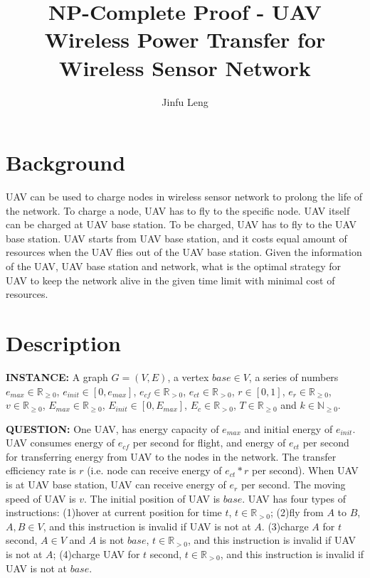 \usepackage{amsfonts}


\title{NP-Complete Proof - UAV Wireless Power Transfer for Wireless Sensor Network}
\author{Jinfu Leng}
\maketitle
\section{Background}
UAV can be used to charge nodes in wireless sensor network to prolong the life of the network. To charge a node, UAV has to fly to the specific node. UAV itself can be charged at UAV base station. To be charged, UAV has to fly to the UAV base station. UAV starts from UAV base station, and it costs equal amount of resources when the UAV flies out of the UAV base station. Given the information of the UAV, UAV base station and network, what is the optimal strategy for UAV to keep the network alive in the given time limit with minimal cost of resources.

\section{Description}
\noindent
\textbf{INSTANCE:} 
A graph $G = (V, E)$, a vertex $base \in V$, a series of numbers $e_{max} \in \mathbb{R}_{\geq0}$, $e_{init} \in [0, e_{max}]$, $e_{cf} \in \mathbb{R}_{>0}$, $e_{ct} \in \mathbb{R}_{>0}$, $r \in [0, 1]$, $e_r \in \mathbb{R}_{\geq0}$, $v \in \mathbb{R}_{\geq0}$, $E_{max} \in \mathbb{R}_{\geq0}$, $E_{init} \in [0, E_{max}]$, $E_{c} \in \mathbb{R}_{>0}$, $T \in \mathbb{R}_{\geq0}$ and $k \in \mathbb{N}_{\geq0}$.

\noindent
\textbf{QUESTION:} 
One UAV, has energy capacity of $e_{max}$ and initial energy of $e_{init}$. UAV consumes energy of $e_{cf}$ per second for flight, and energy of $e_{ct}$ per second for transferring energy from UAV to the nodes in the network. The transfer efficiency rate is $r$ (i.e. node can receive energy of $e_{ct}*r$ per second). When UAV is at UAV base station, UAV can receive energy of $e_r$ per second. The moving speed of UAV is $v$. The initial position of UAV is $base$. UAV has four types of instructions: (1)hover at current position for time $t$, $t \in \mathbb{R}_{>0}$; (2)fly from $A$ to $B$, $A,B \in V$, and this instruction is invalid if UAV is not at $A$. (3)charge $A$ for $t$ second, $A \in V$ and $A$ is not $base$, $t \in \mathbb{R}_{>0}$, and this instruction is invalid if UAV is not at $A$; (4)charge UAV for $t$ second, $t \in \mathbb{R}_{>0}$, and this instruction is invalid if UAV is not at $base$.


